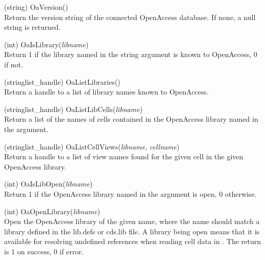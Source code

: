 \begin{description}
\item{(string) \vt OaVersion()}\\
Return the version string of the connected OpenAccess database.
If none, a null string is returned.

\item{(int) \vt OaIsLibrary({\it libname\/})}\\
Return 1 if the library named in the string argument is known to
OpenAccess, 0 if not.

\item{(stringlist\_handle) \vt OaListLibraries()}\\
Return a handle to a list of library names known to OpenAccess.

\item{(stringlist\_handle) \vt OaListLibCells({\it libname\/})}\\
Return a list of the names of cells contained in the OpenAccess
library named in the argument.

\item{(stringlist\_handle) \vt OaListCellViews({\it libname\/},
 {\it cellname\/})}\\
Return a handle to a list of view names found for the given cell in
the given OpenAccess library.

\item{(int) \vt OaIsLibOpen({\it libname\/})}\\
Return 1 if the OpenAccess library named in the argument is open,  
0 otherwise.

\item{(int) \vt OaOpenLibrary({\it libname\/})}\\
Open the OpenAccess library of the given name, where the name should
match a library defined in the {\vt lib.defs} or {\vt cds.lib} file. 
A library being open means that it is available for resolving
undefined references when reading cell data in {\Xic}.  The return is
1 on success, 0 if error.


\end{description}
